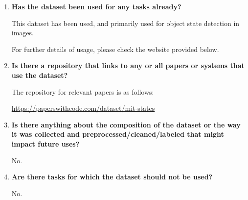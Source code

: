 \documentclass[a4paper,12pt]{article}
\begin{document}
\begin{enumerate}
    \item \textbf{Has the dataset been used for any tasks already?}
    
    This dataset has been used, and primarily used for object state detection in images. 

    For further details of usage, please check the website provided below.
    
    \item \textbf{Is there a repository that links to any or all papers or systems that use the dataset?}
    
    
    The repository for relevant papers is as follows:

    \url{https://paperswithcode.com/dataset/mit-states}

    \item \textbf{Is there anything about the composition of the dataset or the way it was collected and preprocessed/cleaned/labeled that might impact future uses?}
    
    No. 

    \item \textbf{Are there tasks for which the dataset should not be used?}
    
    No.
    
\end{enumerate}
\end{document}
